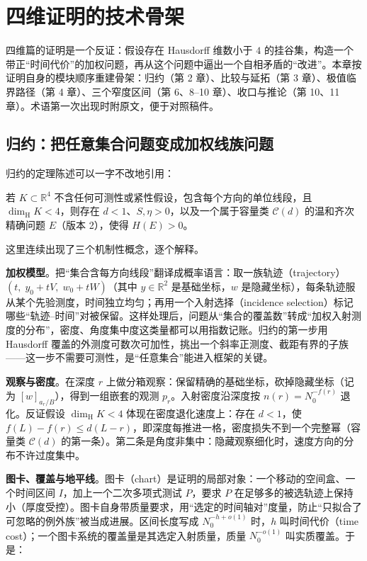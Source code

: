 \section{四维证明的技术骨架}

四维篇的证明是一个反证：假设存在 Hausdorff 维数小于 $4$ 的挂谷集，构造一个带正“时间代价”的加权问题，再从这个问题中逼出一个自相矛盾的“改进”。本章按证明自身的模块顺序重建骨架：归约（第 2 章）、比较与延拓（第 3 章）、极值临界路径（第 4 章）、三个窄度区间（第 6、8--10 章）、收口与推论（第 10、11 章）。术语第一次出现时附原文，便于对照稿件。

\subsection{归约：把任意集合问题变成加权线族问题}

归约的定理陈述可以一字不改地引用：

\begin{theorem}
若 $K\subset\mathbb{R}^4$ 不含任何可测性或紧性假设，包含每个方向的单位线段，且 $\dim_{\mathrm{H}}K<4$，则存在 $d<1$、$S,\eta>0$，以及一个属于容量类 $\mathcal{C}(d)$ 的温和齐次精确问题 $E$（版本 2），使得 $H(E)>0$。
\end{theorem}

这里连续出现了三个机制性概念，逐个解释。

\textbf{加权模型}。把“集合含每方向线段”翻译成概率语言：取一族轨迹（trajectory）$(t,\; y_0+tV,\; w_0+tW)$（其中 $y\in\mathbb{R}^2$ 是基础坐标，$w$ 是隐藏坐标），每条轨迹服从某个先验测度，时间独立均匀；再用一个入射选择（incidence selection）标记哪些“轨迹--时间”对被保留。这样处理后，问题从“集合的覆盖数”转成“加权入射测度的分布”，密度、角度集中度这类量都可以用指数记账。归约的第一步用 Hausdorff 覆盖的外测度可数次可加性，挑出一个斜率正测度、截距有界的子族——这一步不需要可测性，是“任意集合”能进入框架的关键。

\textbf{观察与密度}。在深度 $r$ 上做分箱观察：保留精确的基础坐标，砍掉隐藏坐标（记为 $[w]_{a_r/B}$），得到一组嵌套的观测 $p_r$。入射密度沿深度按 $n(r)=N_0^{-f(r)}$ 退化。反证假设 $\dim_{\mathrm{H}}K<4$ 体现在密度退化速度上：存在 $d<1$，使 $f(L)-f(r)\le d(L-r)$，即深度每推进一格，密度损失不到一个完整幂（容量类 $\mathcal{C}(d)$ 的第一条）。第二条是角度非集中：隐藏观察细化时，速度方向的分布不许过度集中。

\textbf{图卡、覆盖与地平线}。图卡（chart）是证明的局部对象：一个移动的空间盒、一个时间区间 $I$，加上一个二次多项式测试 $P$，要求 $P$ 在足够多的被选轨迹上保持小（厚度受控）。图卡自身带质量要求，用“选定的时间轴对”度量，防止“只拟合了可忽略的例外族”被当成进展。区间长度写成 $N_0^{-h+o(1)}$ 时，$h$ 叫时间代价（time cost）；一个图卡系统的覆盖量是其选定入射质量，质量 $N_0^{-o(1)}$ 叫实质覆盖。于是：

